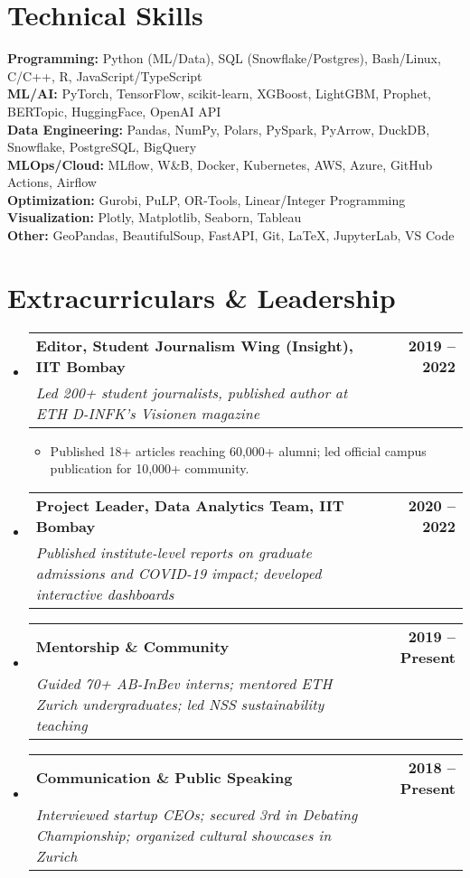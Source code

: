 \documentclass[letterpaper,10pt]{article}
\makeatletter
\newcommand{\resumeItem}[1]{
  \item\small{
    {#1 \vspace{-2pt}}
  }
}
\newcommand{\resumeSubheading}[4]{
  \vspace{-2pt}\item
    \begin{tabular*}{1.0\textwidth}[t]{l@{\extracolsep{\fill}}r}
      \textbf{#1} & \textbf{\small #2} \\
      \textit{\small#3} & \textit{\small #4} \\
    \end{tabular*}\vspace{-7pt}
}
\newcommand{\resumeSubHeadingListStart}{\begin{itemize}[leftmargin=0.0in, label={}]}
\newcommand{\resumeSubHeadingListEnd}{\end{itemize}}
\newcommand{\resumeItemListStart}{\begin{itemize}}
\newcommand{\resumeItemListEnd}{\end{itemize}\vspace{-5pt}}
\makeatother
\begin{document}
\section{Technical Skills}
 \begin{itemize}[leftmargin=0.15in, label={}]
    \small{\item{
     \textbf{Programming:} Python (ML/Data), SQL (Snowflake/Postgres), Bash/Linux, C/C++, R, JavaScript/TypeScript \\
     \textbf{ML/AI:} PyTorch, TensorFlow, scikit-learn, XGBoost, LightGBM, Prophet, BERTopic, HuggingFace, OpenAI API \\
     \textbf{Data Engineering:} Pandas, NumPy, Polars, PySpark, PyArrow, DuckDB, Snowflake, PostgreSQL, BigQuery \\
     \textbf{MLOps/Cloud:} MLflow, W\&B, Docker, Kubernetes, AWS, Azure, GitHub Actions, Airflow \\
     \textbf{Optimization:} Gurobi, PuLP, OR-Tools, Linear/Integer Programming \\
     \textbf{Visualization:} Plotly, Matplotlib, Seaborn, Tableau \\
     \textbf{Other:} GeoPandas, BeautifulSoup, FastAPI, Git, LaTeX, JupyterLab, VS Code
    }}
 \end{itemize}
 \vspace{-16pt}

\section{Extracurriculars \& Leadership}
  \resumeSubHeadingListStart
    \resumeSubheading
      {Editor, Student Journalism Wing (Insight), IIT Bombay}{2019 -- 2022}
      {Led 200+ student journalists, published author at ETH D-INFK's Visionen magazine}{}
      \resumeItemListStart
        \resumeItem{Published 18+ articles reaching 60,000+ alumni; led official campus publication for 10,000+ community.}
      \resumeItemListEnd
    \resumeSubheading
      {Project Leader, Data Analytics Team, IIT Bombay}{2020 -- 2022}
      {Published institute-level reports on graduate admissions and COVID-19 impact; developed interactive dashboards}{}
    \resumeSubheading
      {Mentorship \& Community}{2019 -- Present}
      {Guided 70+ AB-InBev interns; mentored ETH Zurich undergraduates; led NSS sustainability teaching}{}
    \resumeSubheading
      {Communication \& Public Speaking}{2018 -- Present}
      {Interviewed startup CEOs; secured 3rd in Debating Championship; organized cultural showcases in Zurich}{}
  \resumeSubHeadingListEnd
\end{document}
